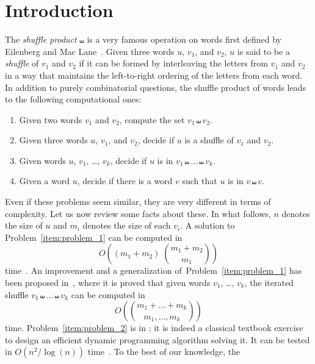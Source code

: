 \documentclass[a4paper]{llncs}
\begin{document}
\section{Introduction}
\label{section:Introduction}
The \emph{shuffle product} $\shuffle$ is a very famous operation on words
first defined by Eilenberg and Mac Lane~\cite{Eilenberg:MacLane:1953}.
Given three words $u$, $v_1$, and $v_2$, $u$ is said to be a \emph{shuffle}
of $v_1$ and $v_2$ if it can be formed by interleaving the letters from
$v_1$ and $v_2$ in a way that maintains the left-to-right ordering of the
letters from each word. In addition to purely combinatorial questions,
the shuffle product of words leads to the following computational ones:
\begin{enumerate}
    \item \label{item:problem_1}
    Given two words $v_1$ and $v_2$, compute the set $v_1 \shuffle v_2$.
    \item \label{item:problem_2}
    Given three words $u$, $v_1$, and $v_2$, decide if $u$ is a shuffle
    of $v_1$ and $v_2$.
    \item \label{item:problem_3}
    Given words $u$, $v_1$, \dots, $v_k$, decide if $u$ is in
    $v_1 \shuffle \dots \shuffle v_k$.
    \item \label{item:problem_4}
    Given a word $u$, decide if there is a word $v$ such that $u$ is
    in $v \shuffle v$.
\end{enumerate}
Even if these problems seem similar, they are very different in terms
of complexity. Let us now review some facts about these. In what follows,
$n$ denotes the size of $u$ and $m_i$ denotes the size of each $v_i$.
A solution to Problem~\ref{item:problem_1} can be computed in
\begin{equation}
    O\left((m_1 + m_2) \; \binom{m_1 + m_2}{m_1}\right)
\end{equation}
time~\cite{Spehner:TCS:1986}. An improvement and a generalization
of~Problem~\ref{item:problem_1} has been proposed
in~\cite{Allauzen:IGM:2000}, where it is proved that given words
$v_1$, \dots, $v_k$, the iterated shuffle
$v_1 \shuffle \dots \shuffle v_k$ can be computed in
\begin{equation}
    O\left(\binom{m_1 + \dots + m_k}{m_1, \dots, m_k}\right)
\end{equation}
time. Problem~\ref{item:problem_2} is in \Pclass; it is indeed a
classical textbook exercise to design an efficient dynamic programming
algorithm solving it. It can be tested in $O\left(n^2 / \log(n)\right)$
time~\cite{Leeuwen:Nivat:IPL:1982}. To the best of our knowledge, the
\end{document}
